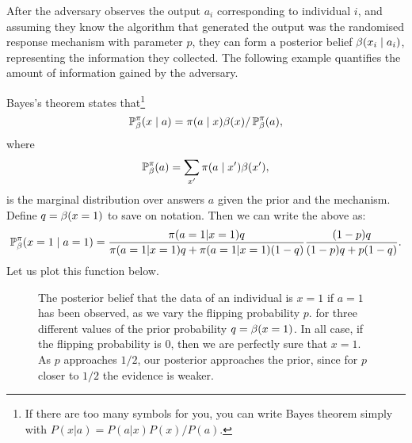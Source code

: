 \begin{frame}
{    After the adversary observes the output $a_i$ corresponding to
    individual $i$, and assuming they know the algorithm that
    generated the output was the randomised response mechanism with
    parameter $p$, they can form a posterior belief
    $\beta(x_i \mid a_i)$, representing the information they
    collected. The following example quantifies the amount of
    information gained by the adversary.  }
  \begin{example}
    Bayes's theorem states that\footnote{If there are too many symbols for you, you can write Bayes theorem simply with $P(x | a) = P(a | x) P(x) / P(a)$.}
    \[
      \mathop{\mbox{\ensuremath{\mathbb{P}}}}\nolimits^\pi_\beta(x \mid a) = \pi(a \mid x) \beta(x) / \mathop{\mbox{\ensuremath{\mathbb{P}}}}\nolimits^\pi_\beta(a),
    \]
    where
    \[
      \mathop{\mbox{\ensuremath{\mathbb{P}}}}\nolimits^\pi_\beta(a) = \sum_{x'} \pi(a \mid x') \beta(x'),
    \]
    is the marginal distribution over answers $a$ given the prior and the mechanism.
    Define $q = \beta(x = 1)$ to save on notation. Then we can write the above as:
    \[
      \mathop{\mbox{\ensuremath{\mathbb{P}}}}\nolimits^\pi_\beta(x = 1 \mid a = 1) =
      \frac{\pi(a = 1 | x = 1) q}
      {\pi(a = 1 | x = 1) q + \pi(a = 1 | x = 1) (1 - q)}
      \frac{(1 - p) q}{(1 - p)q + p(1 - q)}.
    \]
    Let us plot this function below.
    \begin{figure}[h]
      \centering
      \caption{The posterior belief that the data of an individual is $x= 1$ if $a = 1$ has been observed, as we vary the flipping probability $p$. for three different values of the prior probability $q = \beta(x = 1)$. In all case, if the flipping probability is 0, then we are perfectly sure that $x=1$. As $p$ approaches $1/2$, our posterior approaches the prior, since for $p$ closer to $1/2$ the evidence is weaker.}

\end{figure}
\end{example}
\end{frame}
